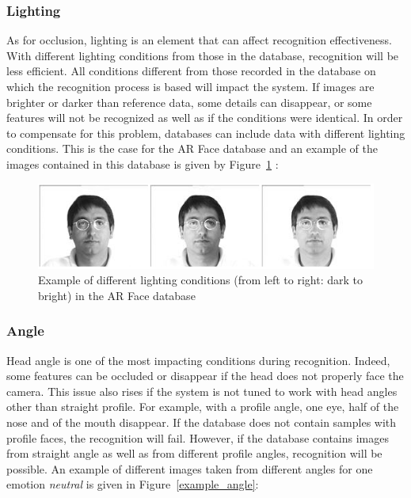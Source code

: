 \subsubsection{Lighting}

\vspace{\baselineskip}
\noindent As for occlusion, lighting is an element that can affect recognition effectiveness. With different lighting conditions from those in the database, recognition will be less efficient. All conditions different from those recorded  in the database on which the recognition process is based will impact the system. If images are brighter or darker than reference data, some details can disappear, or some features will not be recognized as well as if the conditions were identical. In order to compensate for this problem, databases can include data with different lighting conditions. This is the case for the AR Face database and an example of the images contained in this database is given by Figure~\ref{arface_example1} \cite{ARFACE}:
\newline

\begin{figure}[!h]
\begin{center}
\noindent \includegraphics[scale=0.7]{figures/arface_example1} 
\newline
\caption{Example of different lighting conditions (from left to right: dark to bright) in the AR Face database}
\label{arface_example1}
\end{center} 
\end{figure}

\subsubsection{Angle}

\vspace{\baselineskip}
\noindent Head angle is one of the most impacting conditions during recognition. Indeed, some features can be occluded or disappear if the head does not properly face the camera. This issue also rises if the system is not tuned to work with head angles other than straight profile. For example, with a profile angle, one eye, half of the nose and of the mouth disappear. If the database does not contain samples with profile faces, the recognition will fail. However, if the database contains images from straight angle as well as from different profile angles, recognition will be possible. An example of different images taken from different angles for one emotion \textit{neutral} is given in Figure~\ref{example_angle}:
\newline

